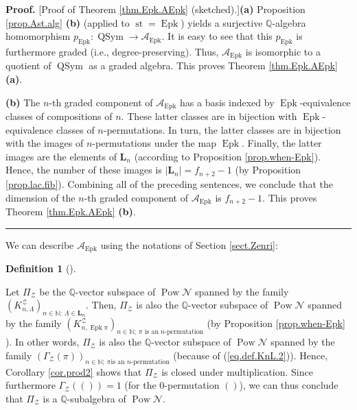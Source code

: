 \documentclass[numbers=enddot,12pt,final,onecolumn,notitlepage]{scrartcl}%
\theoremstyle{definition}
\newtheorem{defi}[theo]{Definition}
\newenvironment{definition}[1][]
{\begin{defi}[#1]\begin{leftbar}}
{\end{leftbar}\end{defi}}
\newenvironment{proof}[1][Proof]{\noindent\textbf{#1.} }{\ \rule{0.5em}{0.5em}}
\newenvironment{verlong}{}{}
\newcommand{\NN}{\mathbb{N}}
\begin{document}
\begin{verlong}
\begin{proof}
[Proof of Theorem \ref{thm.Epk.AEpk} (sketched).]\textbf{(a)} Proposition
\ref{prop.Ast.alg} \textbf{(b)} (applied to $\operatorname*{st}%
=\operatorname*{Epk}$) yields a surjective $\mathbb{Q}$-algebra homomorphism
$p_{\operatorname*{Epk}}:\operatorname*{QSym}\rightarrow\mathcal{A}%
_{\operatorname*{Epk}}$. It is easy to see that this $p_{\operatorname*{Epk}}$
is furthermore graded (i.e., degree-preserving). Thus, $\mathcal{A}%
_{\operatorname*{Epk}}$ is isomorphic to a quotient of $\operatorname*{QSym}$
as a graded algebra. This proves Theorem \ref{thm.Epk.AEpk} \textbf{(a)}.

\textbf{(b)} The $n$-th graded component of $\mathcal{A}_{\operatorname*{Epk}%
}$ has a basis indexed by $\operatorname*{Epk}$-equivalence classes of
compositions of $n$. These latter classes are in bijection with
$\operatorname*{Epk}$-equivalence classes of $n$-permutations. In turn, the
latter classes are in bijection with the images of $n$-permutations under the
map $\operatorname*{Epk}$. Finally, the latter images are the elements of
$\mathbf{L}_n$ (according to Proposition \ref{prop.when-Epk}).
Hence, the number of these images is $\left|\mathbf{L}_n\right|
= f_{n+2} - 1$ (by Proposition \ref{prop.lac.fib}). Combining all of the
preceding sentences, we conclude that the dimension of the $n$-th graded
component of $\mathcal{A}_{\operatorname*{Epk}}$ is $f_{n+2}-1$. This proves
Theorem \ref{thm.Epk.AEpk} \textbf{(b)}.
\end{proof}
\end{verlong}

We can describe $\mathcal{A}_{\operatorname*{Epk}}$ using the notations
of Section \ref{sect.Zenri}:

\begin{definition}
Let $\Pi_{\mathcal{Z}}$ be the $\mathbb{Q}$-vector subspace of
$\operatorname*{Pow}\mathcal{N}$ spanned by the family $\left(  K_{n,\Lambda
}^{\mathcal{Z}}\right)  _{n \in \NN;\  \Lambda \in \mathbf{L}_n}  $.
Then, $\Pi_{\mathcal{Z}}$ is also the $\mathbb{Q}$-vector subspace of
$\operatorname*{Pow}\mathcal{N}$ spanned by the family $\left(
K_{n,\operatorname*{Epk}\pi}^{\mathcal{Z}}\right)  _{n\in\mathbb{N}%
;\ \pi\text{ is an }n\text{-permutation}}$ (by Proposition \ref{prop.when-Epk}%
). In other words, $\Pi_{\mathcal{Z}}$ is also the $\mathbb{Q}$-vector
subspace of $\operatorname*{Pow}\mathcal{N}$ spanned by the family $\left(
\Gamma_{\mathcal{Z}}\left(  \pi\right)  \right)  _{n\in\mathbb{N};\ \pi\text{
is an }n\text{-permutation}}$ (because of (\ref{eq.def.KnL.2})). Hence,
Corollary \ref{cor.prod2} shows that $\Pi_{\mathcal{Z}}$ is closed under
multiplication. Since furthermore $\Gamma_{\mathcal{Z}}\left(
\left( \right) \right)  =1$ (for the $0$-permutation
$\left( \right)$), we can thus conclude that $\Pi
_{\mathcal{Z}}$ is a $\mathbb{Q}$-subalgebra of $\operatorname*{Pow}%
\mathcal{N}$.
\end{definition}
\end{document}
